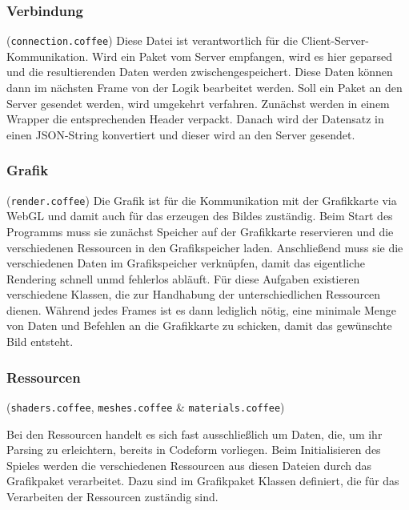 \subsubsection{Verbindung} (\verb+connection.coffee+)
Diese Datei ist verantwortlich für die Client-Server-Kommunikation. Wird ein Paket vom Server empfangen, wird es hier geparsed und die resultierenden Daten werden zwischengespeichert. Diese Daten können dann im nächsten Frame von der Logik bearbeitet werden.
Soll ein Paket an den Server gesendet werden, wird umgekehrt verfahren. Zunächst werden in einem Wrapper die entsprechenden Header verpackt. Danach wird der Datensatz in einen JSON-String konvertiert und dieser wird an den Server gesendet.

\subsubsection{Grafik} (\verb+render.coffee+)
Die Grafik ist für die Kommunikation mit der Grafikkarte via WebGL und damit auch für das erzeugen des Bildes zuständig. Beim Start des Programms muss sie zunächst Speicher auf der Grafikkarte reservieren und die verschiedenen Ressourcen in den Grafikspeicher laden. Anschließend muss sie die verschiedenen Daten im Grafikspeicher verknüpfen, damit das eigentliche Rendering schnell unmd fehlerlos abläuft. Für diese Aufgaben existieren verschiedene Klassen, die zur Handhabung der unterschiedlichen Ressourcen dienen.
Während jedes Frames ist es dann lediglich nötig, eine minimale Menge von Daten und Befehlen an die Grafikkarte zu schicken, damit das gewünschte Bild entsteht.


\subsubsection{Ressourcen} (\verb+shaders.coffee+, \verb+meshes.coffee+ \& \verb+materials.coffee+)

Bei den Ressourcen handelt es sich fast ausschließlich um Daten, die, um ihr Parsing zu erleichtern, bereits in Codeform vorliegen.
Beim Initialisieren des Spieles werden die verschiedenen Ressourcen aus diesen Dateien durch das Grafikpaket verarbeitet. Dazu sind im Grafikpaket Klassen definiert, die für das Verarbeiten der Ressourcen zuständig sind.